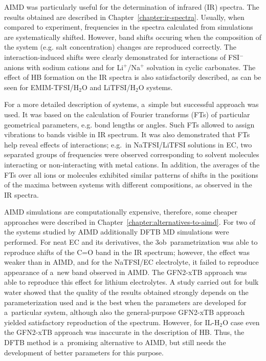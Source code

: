 AIMD was particularly useful for the determination of infrared (IR) spectra. The results obtained are described in Chapter~\ref{chapter:ir-spectra}. Usually, when compared to experiment, frequencies in the spectra calculated from simulations are systematically shifted. However, band shifts occuring when the composition of the system (e.g. salt concentration) changes are reproduced correctly. The interaction-induced shifts were clearly demonstrated for interactions of FSI$^{-}$ anions with sodium cations and for Li$^{+}$/Na$^{+}$ solvation in cyclic carbonates. The effect of HB formation on the IR spectra is also satisfactorily described, as can be seen for EMIM-TFSI/H$_2$O and LiTFSI/H$_2$O systems.

For a more detailed description of systems, a~simple but successful approach was used. It was based on the calculation of Fourier transforms (FTs) of particular geometrical parameters, e.g. bond lengths or angles. Such FTs allowed to assign vibrations to bands visible in IR spectrum. It was also demonstrated that FTs help reveal effects of interactions; e.g.~in NaTFSI/LiTFSI solutions in EC, two separated groups of frequencies were observed corresponding to solvent molecules interacting or non-interacting with metal cations. In addition, the averages of the FTs over all ions or molecules exhibited similar patterns of shifts in the positions of the maxima between systems with different compositions, as observed in the IR spectra.

AIMD simulations are computationally expensive, therefore, some cheaper approaches were described in Chapter~\ref{chapter:alternatives-to-aimd}. For two of the systems studied by AIMD additionally DFTB MD simulations were performed. For neat EC and its derivatives, the 3ob~parametrization was able to reproduce shifts of the C=O band in the IR spectrum; however, the effect was weaker than in AIMD, and for the NaTFSI/EC electrolyte, it failed to reproduce appearance of a~new band observed in AIMD. The GFN2-xTB approach was able to reproduce this effect for lithium electrolytes. A study carried out for bulk water showed that the quality of the results obtained strongly depends on the parameterization used and is the best when the parameters are developed for a~particular system, although also the general-purpose GFN2-xTB approach yielded satisfactory reproduction of the spectrum. However, for IL-H$_2$O case even the GFN2-xTB approach was inaccurate in the description of HB. Thus, the DFTB method is a~promising alternative to AIMD, but still needs the development of better parameters for this purpose.

